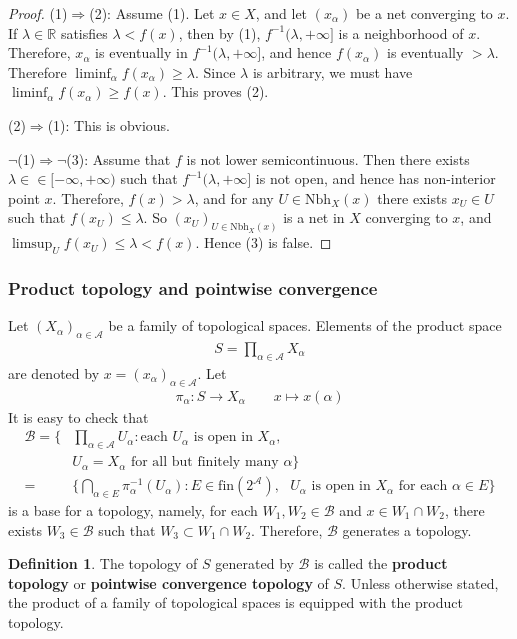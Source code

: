 \documentclass[12pt,b5paper,notitlepage]{article}
\theoremstyle{definition}
\newtheorem{df}{Definition}[subsection]
\theoremstyle{plain}
\newcommand{\mc}{\mathcal}
\newcommand{\scr}{\mathscr}
\newcommand{\Rbb}{\mathbb R}
\newcommand{\fin}{\mathrm{fin}}
\newcommand{\Nbh}{\mathrm{Nbh}}
\numberwithin{equation}{section}
\begin{document}
\begin{proof}
(1)$\Rightarrow$(2): Assume (1). Let $x\in X$, and let $(x_\alpha)$ be a net converging to $x$. If $\lambda\in\Rbb$ satisfies $\lambda<f(x)$, then by (1), $f^{-1}(\lambda,+\infty]$ is a neighborhood of $x$. Therefore, $x_\alpha$ is eventually in $f^{-1}(\lambda,+\infty]$, and hence $f(x_\alpha)$ is eventually $>\lambda$. Therefore $\liminf_\alpha f(x_\alpha)\geq\lambda$. Since $\lambda$ is arbitrary, we must have $\liminf_\alpha f(x_\alpha)\geq f(x)$. This proves (2).

(2)$\Rightarrow$(1): This is obvious.

$\neg$(1)$\Rightarrow$$\neg$(3): Assume that $f$ is not lower semicontinuous. Then there exists $\lambda\in\in[-\infty,+\infty)$ such that $f^{-1}(\lambda,+\infty]$ is not open, and hence has non-interior point $x$. Therefore, $f(x)>\lambda$, and for any $U\in\Nbh_X(x)$ there exists $x_U\in U$ such that $f(x_U)\leq\lambda$. So $(x_U)_{U\in\Nbh_X(x)}$ is a net in $X$ converging to $x$, and $\limsup_U f(x_U)\leq\lambda<f(x)$. Hence (3) is false. 
\end{proof}







\subsubsection{Product topology and pointwise convergence}

Let $(X_\alpha)_{\alpha\in\scr A}$ be a family of topological spaces. Elements of the product space
\begin{align*}
S=\prod_{\alpha\in\scr A}X_\alpha
\end{align*}
are denoted by $x=(x_\alpha)_{\alpha\in\scr A}$. Let
\begin{align*}
\pi_\alpha:S\rightarrow X_\alpha\qquad x\mapsto x(\alpha)
\end{align*}
It is easy to check that
\begin{align*}
\mc B=\Big\{&\prod_{\alpha\in\scr A} U_\alpha: \text{each $U_\alpha$ is open in $X_\alpha$},\\
& \text{$U_\alpha=X_\alpha$ for all but finitely many $\alpha$}\Big\}\\
=&\Big\{\bigcap_{\alpha\in E} \pi_\alpha^{-1}(U_\alpha):E\in\fin(2^{\scr A}), \text{ $U_\alpha$ is open in $X_\alpha$ for each $\alpha\in E$}    \Big\}
\end{align*}
is a base for a topology, namely, for each $W_1,W_2\in\mc B$ and $x\in W_1\cap W_2$, there exists $W_3\in\mc B$ such that $W_3\subset W_1\cap W_2$. Therefore, $\mc B$ generates a topology.
\begin{df}
The topology of $S$ generated by $\mc B$ is called the \textbf{product topology}  or \textbf{pointwise convergence topology}  of $S$. Unless otherwise stated, the product of a family of topological spaces is equipped with the product topology.
\end{df}
\end{document}
